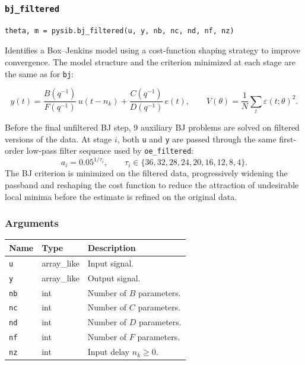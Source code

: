 \documentclass[../main]{subfiles}
\begin{document}
\newpage

\subsubsection{\texttt{bj\_filtered}}

\begin{lstlisting}
theta, m = pysib.bj_filtered(u, y, nb, nc, nd, nf, nz)
\end{lstlisting}

Identifies a Box--Jenkins model using a cost-function shaping
strategy to improve convergence.  The model structure and the
criterion minimized at each stage are the same as for \texttt{bj}:

\[
  y(t) = \frac{B(q^{-1})}{F(q^{-1})}\,u(t-n_k)
       + \frac{C(q^{-1})}{D(q^{-1})}\,e(t), \qquad
  V(\theta) = \frac{1}{N}\sum_t \varepsilon(t;\theta)^2.
\]

Before the final unfiltered BJ step, 9 auxiliary BJ problems are
solved on filtered versions of the data.  At stage $i$, both
\texttt{u} and \texttt{y} are passed through the same first-order
low-pass filter sequence used by \texttt{oe\_filtered}:
\[
  a_i = 0.05^{1/\tau_i}, \qquad
  \tau_i \in \{36,32,28,24,20,16,12,8,4\}.
\]
The BJ criterion is
minimized on the filtered data, progressively widening the passband
and reshaping the cost function to reduce the attraction of
undesirable local minima before the estimate is refined on the
original data.

\subsubsection*{Arguments}
\begin{center}
\begin{tabular}{lll}
  \toprule
  Name & Type & Description \\
  \midrule
  \texttt{u}  & array\_like & Input signal. \\
  \texttt{y}  & array\_like & Output signal. \\
  \texttt{nb} & int & Number of $B$ parameters. \\
  \texttt{nc} & int & Number of $C$ parameters. \\
  \texttt{nd} & int & Number of $D$ parameters. \\
  \texttt{nf} & int & Number of $F$ parameters. \\
  \texttt{nz} & int & Input delay $n_k \geq 0$. \\
  \bottomrule
\end{tabular}
\end{center}
\end{document}
